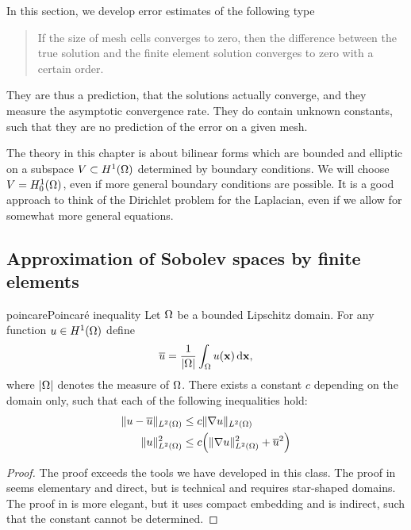 \begin{intro}
  In this section, we develop error estimates of the following type
  \begin{verse}
    If the size of mesh cells converges to zero, then the difference
    between the true solution and the finite element solution
    converges to zero with a certain order.
  \end{verse}
  They are thus a prediction, that the solutions actually converge,
  and they measure the asymptotic convergence rate. They do contain
  unknown constants, such that they are no prediction of the error on
  a given mesh.

  The theory in this chapter is about bilinear forms which are bounded
  and elliptic on a subspace $V \subset H^1(\Omega)$ determined by
  boundary conditions. We will choose $V = H^1_0(\Omega)$, even if
  more general boundary conditions are possible. It is a good approach
  to think of the Dirichlet problem for the Laplacian, even if we
  allow for somewhat more general equations.
\end{intro}

\subsection{Approximation of Sobolev spaces by finite elements}

\begin{Lemma*}{poincare}{Poincaré inequality}
  Let $\Omega$ be a bounded Lipschitz domain. For any function
  $u\in H^1(\Omega)$ define
  \begin{gather}
    \overline u = \frac1{\lvert\Omega\rvert} \int_\Omega u(\mathbf x) \,\mathrm{d} \mathbf x,
  \end{gather}
  where $\lvert\Omega\rvert$ denotes the measure of $\Omega$. There exists
  a constant $c$ depending on the domain only, such that each of the
  following inequalities hold:
  \begin{align}
    \lVert u-\overline u\rVert_{L^2(\Omega)} &\le c \lVert\nabla u\rVert_{L^2(\Omega)}\\
    \lVert u\rVert_{L^2(\Omega)}^2 &\le c \Bigl(\lVert\nabla u\rVert_{L^2(\Omega)}^2 + \overline u^2\Bigr)
  \end{align}
\end{Lemma*}

\begin{proof}
  The proof exceeds the tools we have developed in this class. The
  proof in \cite[Section 7.8]{GilbargTrudinger98} seems elementary and
  direct, but is technical and requires star-shaped domains. The proof
  in \cite[Section 5.8.1]{Evans98} is more elegant, but it uses
  compact embedding and is indirect, such that the constant cannot be
  determined.
\end{proof}

